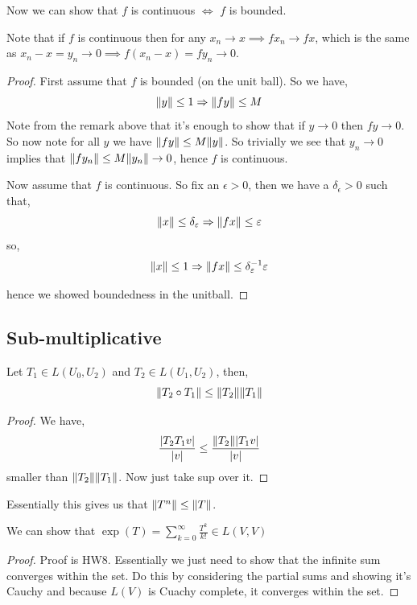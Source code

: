 \begin{theorem}
Now we can show that $f$ is continuous $\iff$ $f$ is bounded.
\end{theorem}
\begin{remark}
  Note that if $f$ is continuous then for any $x_n \to x \implies f x_n \to f x$, which is the same as $x_n - x  = y_n \to 0 \implies f (x_n - x) = f y_n \to 0$.
\end{remark}
\begin{proof}
  First assume that $f$ is bounded (on the unit ball). So we have, 
  \[
    \lVert y\rVert \le 1 \Rightarrow \lVert f y\rVert \le M
  \]
  Note from the remark above that it's enough to show that if $y \to 0$ then $f y \to 0$. So now note for all $y$ we have $\lVert fy\rVert \le M \lVert y\rVert$. So trivially we see that $y_n \to 0$ implies that $\lVert fy_n\rVert  \le M \lVert y_n\rVert \to 0$, hence $f$ is continuous.

  \vspace{1em}
  Now assume that $f$ is continuous. So fix an $\epsilon > 0$, then we have a $\delta_{\epsilon} > 0$ such that, 
  \[
    \lVert x\rVert  \le \delta_{\varepsilon} \Rightarrow \lVert f x\rVert \le \varepsilon
  \]
  so, 
  \[
    \lVert x\rVert \le 1 \Rightarrow \lVert fx\rVert \le \delta_{\varepsilon}^{-1} \varepsilon
  \]

  hence we showed boundedness in the unitball.
\end{proof}

\subsection{Sub-multiplicative}
Let $T_{1} \in L(U_{0}, U_{2})$ and $T_{2} \in L(U_{1}, U_{2})$, then, 
\[
  \lVert T_{2} \circ T_{1}\rVert \le \lVert T_{2}\rVert \lVert T_{1}\rVert
\]
\begin{proof}
  We have, 
  \[
    \frac{\left | T_{2} T_{1} v\right |}{|v|} \le \frac{\lVert T_{2}\rVert | T_{1} v|}{|v|}
  \]
  smaller than $\lVert T_{2}\rVert \lVert T_{1}\rVert$. Now just take sup over it.
\end{proof}

Essentially this gives us that $\lVert T^{n}\rVert \le \lVert T\rVert$.
\begin{corollary}
  We can show that $\exp(T) = \sum_{k = 0}^{\infty}  \frac{T^{k}}{k!} \in L(V, V)$ 
\end{corollary}
\begin{proof}
  Proof is HW8. Essentially we just need to show that the infinite sum  converges within the set. Do this by considering the partial sums and showing it's Cauchy and because $L(V)$ is Cuachy complete, it converges within the set.
\end{proof}


